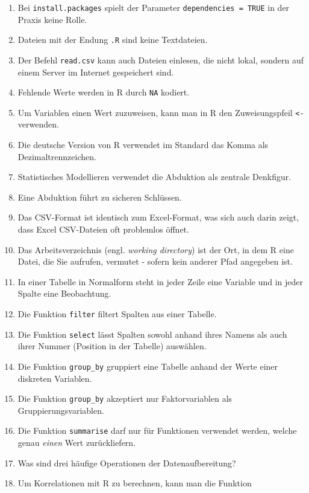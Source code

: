 \documentclass[12pt,ngerman,]{book}
\theoremstyle{definition}
\theoremstyle{definition}
\theoremstyle{remark}
\begin{document}
\begin{enumerate}
\def\labelenumi{\arabic{enumi}.}
\item
  Bei \texttt{install.packages} spielt der Parameter
  \texttt{dependencies\ =\ TRUE} in der Praxis keine Rolle.
\item
  Dateien mit der Endung \texttt{.R} sind keine Textdateien.
\item
  Der Befehl \texttt{read.csv} kann auch Dateien einlesen, die nicht
  lokal, sondern auf einem Server im Internet gespeichert sind.
\item
  Fehlende Werte werden in R durch \texttt{NA} kodiert.
\item
  Um Variablen einen Wert zuzuweisen, kann man in R den Zuweisungspfeil
  \texttt{\textless{}-} verwenden.
\item
  Die deutsche Version von R verwendet im Standard das Komma als
  Dezimaltrennzeichen.
\item
  Statistisches Modellieren verwendet die Abduktion als zentrale
  Denkfigur.
\item
  Eine Abduktion führt zu sicheren Schlüssen.
\item
  Das CSV-Format ist identisch zum Excel-Format, was sich auch darin
  zeigt, dass Excel CSV-Dateien oft problemlos öffnet.
\item
  Das Arbeitsverzeichnis (engl. \emph{working directory}) ist der Ort,
  in dem R eine Datei, die Sie aufrufen, vermutet - sofern kein anderer
  Pfad angegeben ist.
\item
  In einer Tabelle in Normalform steht in jeder Zeile eine Variable und
  in jeder Spalte eine Beobachtung.
\item
  Die Funktion \texttt{filter} filtert Spalten aus einer Tabelle.
\item
  Die Funktion \texttt{select} lässt Spalten sowohl anhand ihres Namens
  als auch ihrer Nummer (Position in der Tabelle) auswählen.
\item
  Die Funktion \texttt{group\_by} gruppiert eine Tabelle anhand der
  Werte einer diskreten Variablen.
\item
  Die Funktion \texttt{group\_by} akzeptiert nur Faktorvariablen als
  Gruppierungsvariablen.
\item
  Die Funktion \texttt{summarise} darf nur für Funktionen verwendet
  werden, welche genau \emph{einen} Wert zurückliefern.
\item
  Was sind drei häufige Operationen der Datenaufbereitung?
\item
  Um Korrelationen mit R zu berechnen, kann man die Funktion

\end{enumerate}
\end{document}
